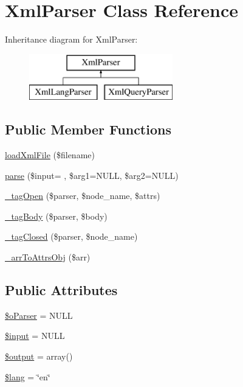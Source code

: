 \hypertarget{classXmlParser}{}\section{Xml\+Parser Class Reference}
\label{classXmlParser}
Inheritance diagram for Xml\+Parser\+:\begin{figure}[H]
\begin{center}
\leavevmode
\includegraphics[height=2.000000cm]{classXmlParser}
\end{center}
\end{figure}
\subsection*{Public Member Functions}
\begin{DoxyCompactItemize}
\item 
\hyperlink{classXmlParser_a3975b17b893e196069963d433046771b}{load\+Xml\+File} (\$filename)
\item 
\hyperlink{classXmlParser_aa7b52a3ab42568f6f49056d928688e7a}{parse} (\$input= \textquotesingle{}\textquotesingle{}, \$arg1=N\+U\+LL, \$arg2=N\+U\+LL)
\item 
\hyperlink{classXmlParser_a01facf5db302e49b0b61fb0e1b1fee36}{\+\_\+tag\+Open} (\$parser, \$node\+\_\+name, \$attrs)
\item 
\hyperlink{classXmlParser_a1205550b688631ab1296365904c61a92}{\+\_\+tag\+Body} (\$parser, \$body)
\item 
\hyperlink{classXmlParser_acb524a3ecf27535c9b085a93d714e1c5}{\+\_\+tag\+Closed} (\$parser, \$node\+\_\+name)
\item 
\hyperlink{classXmlParser_ad6c6c76f2e0c9fbd04c071fc30f1a193}{\+\_\+arr\+To\+Attrs\+Obj} (\$arr)
\end{DoxyCompactItemize}
\subsection*{Public Attributes}
\begin{DoxyCompactItemize}
\item 
\hyperlink{classXmlParser_aeee1082b5150f2adb53b16b42ca1b9f5}{\$o\+Parser} = N\+U\+LL
\item 
\hyperlink{classXmlParser_a65903457181cddd5d100685e0d6ba66a}{\$input} = N\+U\+LL
\item 
\hyperlink{classXmlParser_aa4324be74ded61847ce33730c7785389}{\$output} = array()
\item 
\hyperlink{classXmlParser_adbe603248522105c2912dcddeedcd6ab}{\$lang} = \char`\"{}en\char`\"{}
\end{DoxyCompactItemize}


